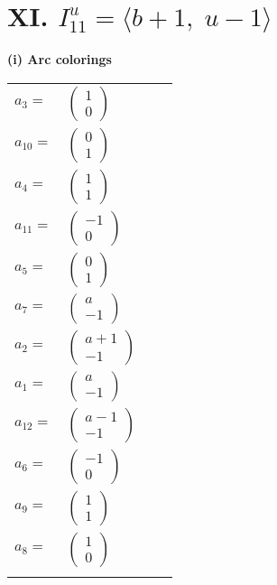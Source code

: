 \documentclass[1p]{elsarticle_modified}
\theoremstyle{definition}
\begin{document}
\centering \section*{XI. $I^u_{11}= \langle b+1,\;u-1 \rangle$}
\flushleft \textbf{(i) Arc colorings}\\
\begin{tabular}{m{7pt} m{180pt} m{7pt} m{180pt} }
\flushright $a_{3}=$&$\begin{pmatrix}1\\0\end{pmatrix}$ \\
\flushright $a_{10}=$&$\begin{pmatrix}0\\1\end{pmatrix}$ \\
\flushright $a_{4}=$&$\begin{pmatrix}1\\1\end{pmatrix}$ \\
\flushright $a_{11}=$&$\begin{pmatrix}-1\\0\end{pmatrix}$ \\
\flushright $a_{5}=$&$\begin{pmatrix}0\\1\end{pmatrix}$ \\
\flushright $a_{7}=$&$\begin{pmatrix}a\\-1\end{pmatrix}$ \\
\flushright $a_{2}=$&$\begin{pmatrix}a+1\\-1\end{pmatrix}$ \\
\flushright $a_{1}=$&$\begin{pmatrix}a\\-1\end{pmatrix}$ \\
\flushright $a_{12}=$&$\begin{pmatrix}a-1\\-1\end{pmatrix}$ \\
\flushright $a_{6}=$&$\begin{pmatrix}-1\\0\end{pmatrix}$ \\
\flushright $a_{9}=$&$\begin{pmatrix}1\\1\end{pmatrix}$ \\
\flushright $a_{8}=$&$\begin{pmatrix}1\\0\end{pmatrix}$\\&\end{tabular}
\end{document}
